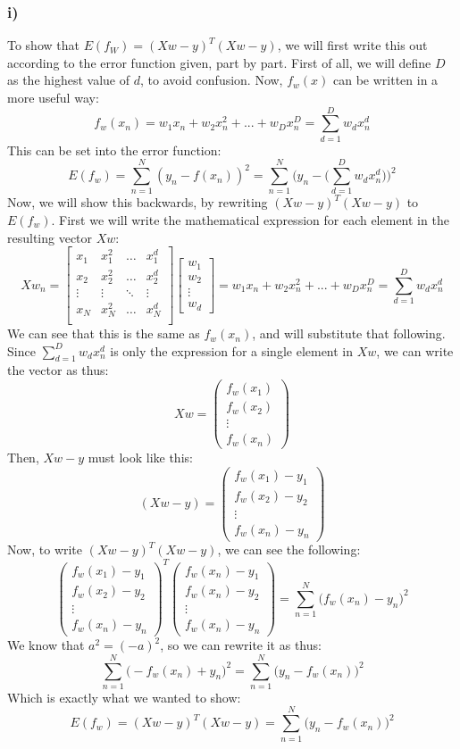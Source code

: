 \subsubsection{i)}
To show that $E(f_W)=(Xw-y)^T(Xw-y)$, we will first write this out according to the error function given, part by part. First of all, we will define $D$ as the highest value of $d$, to avoid confusion. Now, $f_w(x)$ can be written in a more useful way:
$$
f_w(x_n) = w_1x_n+w_2x_n^2+...+w_Dx_n^D = \sum_{d=1}^D w_d x_n^d
$$
This can be set into the error function:
$$
E(f_w) = \sum_{n=1}^N (y_n-f(x_n))^2 = \sum_{n=1}^N \Big(y_n-\Big(\sum_{d=1}^D w_d x_n^d\Big)\Big)^2
$$
Now, we will show this backwards, by rewriting $(Xw-y)^T(Xw-y)$ to $E(f_w)$. First we will write the mathematical expression for each element in the resulting vector $Xw$:
$$
Xw_n =
\left[
\begin{array}{llll}
x_1    & x_1^2  & \dots  & x_1^d  \\
x_2    & x_2^2  & \dots  & x_2^d  \\
\vdots & \vdots & \ddots & \vdots \\
x_N    & x_N^2  & \dots  & x_N^d  \\
\end{array}
\right]
\left[
\begin{array}{l}
w_1\\
w_2\\
\vdots\\
w_d
\end{array}
\right]
=
w_1x_n+w_2x_n^2+...+w_Dx_n^D = \sum_{d=1}^D w_d x_n^d
$$
We can see that this is the same as $f_w(x_n)$, and will substitute that following. Since $\sum_{d=1}^D w_d x_n^d$ is only the expression for a single element in $Xw$, we can write the vector as thus:
$$
Xw = 
\left(
\begin{array}{l}
f_w(x_1) \\
f_w(x_2) \\
\vdots \\
f_w(x_n)
\end{array}
\right)
$$
Then, $Xw-y$ must look like this:
$$
(Xw-y)= 
\left(
\begin{array}{l}
f_w(x_1)-y_1 \\
f_w(x_2)-y_2 \\
\vdots \\
f_w(x_n)-y_n
\end{array}
\right)
$$
Now, to write $(Xw-y)^T(Xw-y)$, we can see the following:
$$
\left(
\begin{array}{l}
f_w(x_1)-y_1 \\
f_w(x_2)-y_2 \\
\vdots \\
f_w(x_n)-y_n
\end{array}
\right)^T
\left(
\begin{array}{l}
f_w(x_n)-y_1 \\
f_w(x_n)-y_2 \\
\vdots \\
f_w(x_n)-y_n
\end{array}
\right)
= \sum_{n=1}^N\Big(f_w(x_n)-y_n\Big)^2
$$
We know that $a^2 = (-a)^2$, so we can rewrite it as thus:
$$
\sum_{n=1}^N\Big(-f_w(x_n)+y_n\Big)^2 = \sum_{n=1}^N\Big(y_n-f_w(x_n)\Big)^2
$$
Which is exactly what we wanted to show:
$$
E(f_w) = (Xw-y)^T(Xw-y) = \sum_{n=1}^N\Big(y_n-f_w(x_n)\Big)^2
$$






